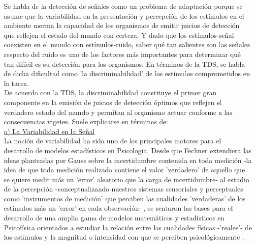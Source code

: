 Se habla de la detección de señales como un problema de adaptación porque se asume que la variabilidad en la presentación y percepción de los estímulos en el ambiente merma la capacidad de los organismos de emitir juicios de detección que reflejen el estado del mundo con certeza. Y dado que los estímulos-señal coexisten en el mundo con estímulos-ruido, saber qué tan salientes son las señales respecto del ruido es uno de los factores más importantes para determinar qué tan difícil es su detección para los organismos. En términos de la TDS, se habla de dicha dificultad como 'la discriminabilidad' de los estímulos comprometidos en la tarea.\\

De acuerdo con la TDS, la discriminabilidad constituye el primer gran componente en la emisión de juicios de detección óptimos que reflejen el verdadero estado del mundo y permitan al organismo actuar conforme a las consecuencias vigetes. Suele explicarse en términos de:\\ %

\underline{a) La Variabilidad en la Señal}\\

La noción de variabilidad ha sido uno de los principales motores para el desarrollo de modelos estadísticos en Psicología. Desde que Fechner extendiera las ideas planteadas por Gauss sobre la incertidumbre contenida en toda medición -la idea de que toda medición realizada contiene el valor 'verdadero' de aquello que se quiere medir más un 'error' aleatorio que la carga de incertidumbre- al estudio de la percepción -conceptualizando nuestros sistemas sensoriales y perceptuales como 'instrumentos de medición' que perciben las cualidades 'verdaderas' de los estímulos más un 'error' en cada observación- \parencite{Fechner, Gauss}, se sentaron las bases para el desarrollo de una amplia gama de modelos matemáticos y estadísticos en Psicofísica orientados a estudiar la relación entre las cualidades físicas -'reales'- de los estímulos y la magnitud o intensidad con que se perciben psicológicamente \parencite{Link1994}.\\

